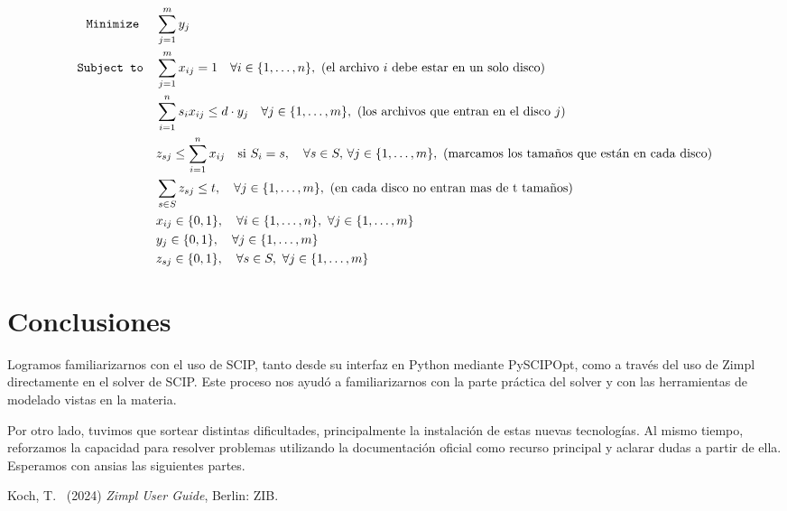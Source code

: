 \documentclass[11pt, a4paper, pdftex]{article}
\begin{document}
\begin{alignat*}{2}
	\minimize
	& \sum_{j = 1}^{m} y_{j}\\
	\subjto
	& \sum_{j = 1}^{m} x_{ij} = 1 \quad \forall i \in \{1, \ldots, n\},\ \text{(el archivo $i$ debe estar en un solo disco)}\\
	& \sum_{i = 1}^{n} s_{i} x_{ij} \le d\cdot y_{j} \quad \forall j \in \{1, \ldots, m\},\ \text{(los archivos que entran en el disco $j$)}\\
        & z_{sj} \leq \sum_{i=1}^{n} x_{ij} \quad \text{si } S_i = s, \quad \forall s \in S, \, \forall j \in \{1, \ldots, m\},\ \text{(marcamos los tamaños que están en cada disco)} \\
        & \sum_{s \in S} z_{sj} \leq t, \quad \forall j \in \{1, \ldots, m\},\ \text{(en cada disco no entran mas de t tamaños)} \\
	& x_{ij} \in \{0,1\}, \quad \forall i \in \{1, \ldots, n\}, \ \forall j \in \{1, \ldots, m\}\\
	& y_{j} \in \{0,1\}, \quad \forall j \in \{1, \ldots, m\} \\
        & z_{sj} \in \{0,1\}, \quad \forall s \in S, \ \forall j \in \{1, \ldots, m\}\\
\end{alignat*}

\section{Conclusiones}

Logramos familiarizarnos con el uso de SCIP, tanto desde su interfaz en
Python mediante PySCIPOpt, como a través del uso de Zimpl directamente
en el solver de SCIP. Este proceso nos ayudó a familiarizarnos con la
parte práctica del solver y con las herramientas de modelado vistas en
la materia.

Por otro lado, tuvimos que sortear distintas dificultades,
principalmente la instalación de estas nuevas tecnologías. Al mismo
tiempo, reforzamos la capacidad para resolver problemas utilizando la
documentación oficial como recurso principal y aclarar dudas a partir de
ella. Esperamos con ansias las siguientes partes.

\begin{thebibliography}{99}
	Koch, T.\
	(2024)
	\emph{Zimpl User Guide},
	Berlin: ZIB.
\end{thebibliography}
\end{document}
